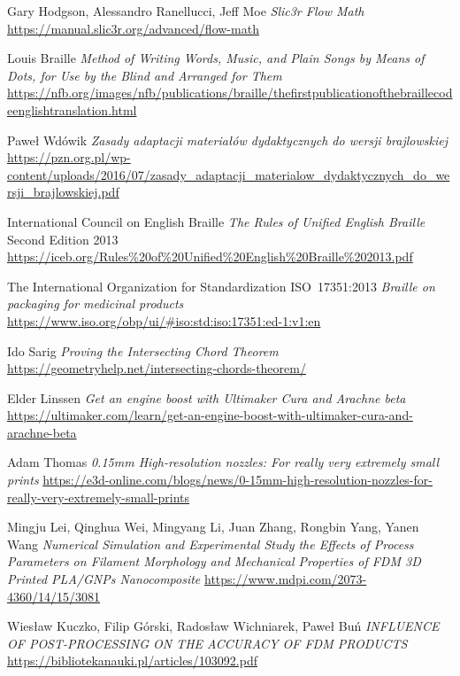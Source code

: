 \documentclass[12pt,a4paper]{article}
\begin{document}
\begin{thebibliography}{9}
Gary Hodgson, Alessandro Ranellucci, Jeff Moe
\textit{Slic3r Flow Math}
\url{https://manual.slic3r.org/advanced/flow-math}

Louis Braille
\textit{Method of Writing Words, Music, and Plain Songs by Means of Dots, for Use by the Blind and Arranged for Them}
\url{https://nfb.org/images/nfb/publications/braille/thefirstpublicationofthebraillecodeenglishtranslation.html}

Paweł Wdówik
\textit{Zasady adaptacji materiałów dydaktycznych do wersji brajlowskiej}
\url{https://pzn.org.pl/wp-content/uploads/2016/07/zasady_adaptacji_materialow_dydaktycznych_do_wersji_brajlowskiej.pdf}

International Council on English Braille
\textit{The Rules of Unified English Braille}
Second Edition 2013
\url{https://iceb.org/Rules%20of%20Unified%20English%20Braille%202013.pdf}

The International Organization for Standardization
ISO 17351:2013
\textit{Braille on packaging for medicinal products}
\url{https://www.iso.org/obp/ui/#iso:std:iso:17351:ed-1:v1:en}

Ido Sarig
\textit{Proving the Intersecting Chord Theorem}
\url{https://geometryhelp.net/intersecting-chords-theorem/}

Elder Linssen
\textit{Get an engine boost with Ultimaker Cura and Arachne beta }
\url{https://ultimaker.com/learn/get-an-engine-boost-with-ultimaker-cura-and-arachne-beta}

Adam Thomas
\textit{0.15mm High-resolution nozzles: For really very extremely small prints}
\url{https://e3d-online.com/blogs/news/0-15mm-high-resolution-nozzles-for-really-very-extremely-small-prints}

Mingju Lei, Qinghua Wei, Mingyang Li, Juan Zhang, Rongbin Yang, Yanen Wang
\textit{Numerical Simulation and Experimental Study the Effects of Process Parameters on Filament Morphology and Mechanical Properties of FDM 3D Printed PLA/GNPs Nanocomposite }
\url{https://www.mdpi.com/2073-4360/14/15/3081}

Wiesław Kuczko, Filip Górski, Radosław Wichniarek, Paweł Buń
\textit{INFLUENCE OF POST-PROCESSING ON THE ACCURACY OF FDM PRODUCTS}
\url{https://bibliotekanauki.pl/articles/103092.pdf}


\end{thebibliography}
\end{document}
